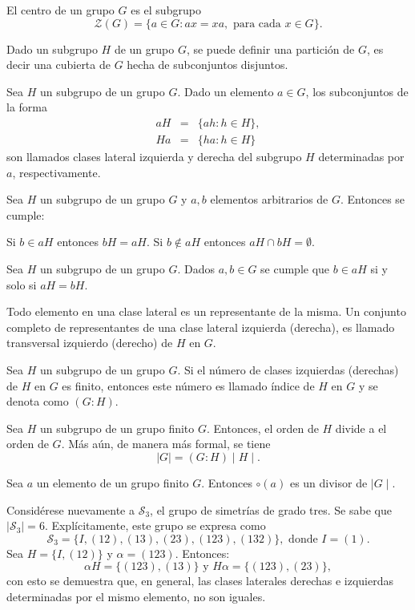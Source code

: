  \begin{definicion}
 El centro de un grupo $G$ es el subgrupo \[ \mathcal{Z}(G) = \{ a \in G \colon ax=xa, \mbox{ para cada }  x \in G \}. \]
\end{definicion}
Dado un subgrupo $H$ de un grupo $G$, se puede definir una partición de $G$, es decir una cubierta de $G$ hecha de subconjuntos disjuntos. 
\begin{definicion}
Sea $H$ un subgrupo de un grupo $G$. Dado un elemento $a \in G$, los subconjuntos de la forma 
\begin{eqnarray*}
aH &=& \{ ah \colon h \in H \}, \\
Ha &=& \{ ha \colon h \in H \} 
\end{eqnarray*}
son llamados clases lateral izquierda y derecha del subgrupo $H$ determinadas por $a$, respectivamente.
\end{definicion}
\newpage
\begin{proposicion}
Sea $H$ un subgrupo de un grupo $G$ y $a,b$ elementos arbitrarios de $G$. Entonces se cumple:
\begin{bulletList}
\newItem Si $b \in aH$ entonces $bH = aH$.
\newItem Si $b \notin aH$ entonces $aH \cap bH = \emptyset$.
\end{bulletList}
\end{proposicion}
\begin{corolario}
Sea $H$ un subgrupo de un grupo $G$. Dados $a,b \in G$ se cumple que $b \in aH$ si y solo si $aH = bH$.
\end{corolario}
Todo elemento en una clase lateral es un representante de la misma. Un conjunto completo de representantes de una clase lateral izquierda (derecha), es llamado transversal izquierdo (derecho) de $H$ en $G$.
\begin{definicion}
Sea $H$ un subgrupo de un grupo $G$. Si el número de clases izquierdas (derechas) de $H$ en $G$ es finito, entonces este número es llamado  índice de $H$ en $G$ y se denota como $(G:H)$.
\end{definicion}
\begin{teorema}[Lagrange]
Sea $H$ un subgrupo de un grupo finito $G$. Entonces, el orden de $H$ divide a el orden de $G$. Más aún, de manera más formal, se tiene
\[ \mid G \mid = (G:H) \mid H \mid. \]
\end{teorema}
\begin{corolario}
Sea $a$ un elemento de un grupo finito $G$. Entonces $\circ(a)$ es un divisor de $\mid G \mid$.
\end{corolario}
\begin{ejemplo}
Considérese nuevamente a $\mathcal{S}_3$, el grupo de simetrías de grado tres. Se sabe que $|  \mathcal{S}_3 | = 6$. Explícitamente, este grupo se expresa como \[ \mathcal{S}_3 = \{ I, (12), (13), (23), (123), (132) \}, \mbox{ donde } I = (1) .\]
Sea $H = \{ I, (12) \} $ y $\alpha = (123)$. Entonces: \[ \alpha H = \{ (123), (13) \}   \mbox{ y } H\alpha = \{ (123), (23) \} ,\] con esto se demuestra que, en general, las clases laterales derechas e izquierdas determinadas por el mismo elemento, no son iguales.
\end{ejemplo}
